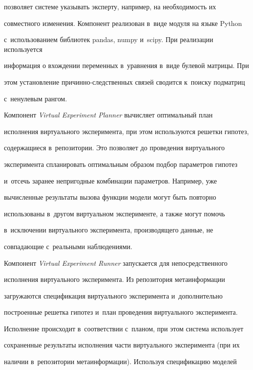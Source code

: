 позволяет системе указывать эксперту, например, на необходимость их 


совместного изменения. Компонент реализован в~виде модуля на языке Python 


с~использованием библиотек pandas, numpy и~scipy. При реализации используется 


информация о вхождении переменных в~уравнения в~виде булевой матрицы. При 


этом установление причинно-следственных связей сводится к~поиску подматриц 


с~ненулевым рангом. 





Компонент \textit{Virtual Experiment Planner} вычисляет оптимальный план 


исполнения виртуального эксперимента, при этом используются решетки гипотез, 


содержащиеся в~репозитории. Это позволяет до проведения виртуального 


эксперимента спланировать оптимальным образом подбор параметров гипотез 


и~отсечь заранее непригодные комбинации параметров. Например, уже 


вычисленные результаты вызова функции модели могут быть повторно 


использованы в~другом виртуальном эксперименте, а также могут помочь 


в~исключении виртуального эксперимента, производящего данные, не 


совпадающие с~реальными наблюдениями.





Компонент \textit{Virtual Experiment Runner} запускается для непосредственного 


исполнения виртуального эксперимента. Из репозитория метаинформации 


загружаются спецификация виртуального эксперимента и~дополнительно 


построенные решетка гипотез и~план проведения виртуального эксперимента. 


Исполнение происходит в~соответствии с~планом, при этом система использует 


сохраненные результаты исполнения части виртуального эксперимента (при их 


наличии в~репозитории метаинформации). Используя спецификацию моделей 


